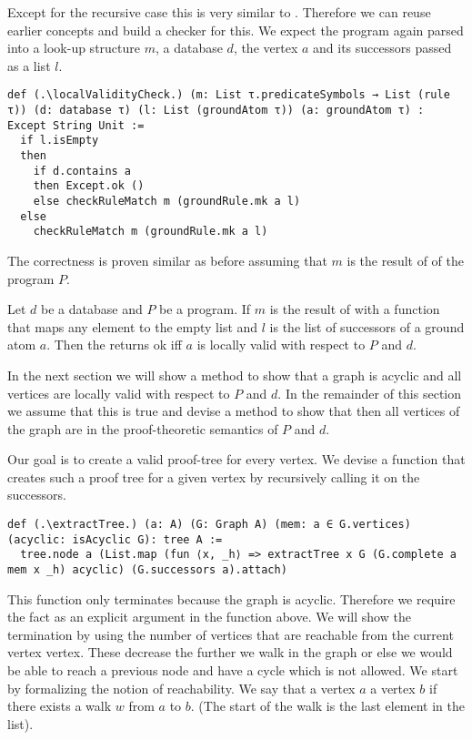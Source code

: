 Except for the recursive case this is very similar to \isValid. Therefore we can reuse earlier concepts and build a checker for this. We expect the program again parsed into a look-up structure $m$, a database $d$, the vertex $a$ and its successors passed as a list $l$.

\begin{lstlisting}
def (.\localValidityCheck.) (m: List τ.predicateSymbols → List (rule τ)) (d: database τ) (l: List (groundAtom τ)) (a: groundAtom τ) : Except String Unit :=
  if l.isEmpty
  then
    if d.contains a
    then Except.ok ()
    else checkRuleMatch m (groundRule.mk a l)
  else
    checkRuleMatch m (groundRule.mk a l)
\end{lstlisting}

The correctness is proven similar as before assuming that $m$ is the result of \parseProgramToSymbolSequenceMap of the program $P$.

\begin{lemma}[\localValidityCheckUnitIffLocallyValid]
    Let $d$ be a database and $P$ be a program. If $m$ is the result of \parseProgramToSymbolSequenceMap with a function that maps any element to the empty list and $l$ is the list of successors of a ground atom $a$. Then the \localValidityCheck returns ok iff $a$ is locally valid with respect to $P$ and $d$.
\end{lemma}

In the next section we will show a method to show that a graph is acyclic and all vertices are locally valid with respect to $P$ and $d$. In the remainder of this section we assume that this is true and devise a method to show that then all vertices of the graph are in the proof-theoretic semantics of $P$ and $d$.

Our goal is to create a valid proof-tree for every vertex. We devise a function that creates such a proof tree for a given vertex by recursively calling it on the successors.

\begin{lstlisting}
def (.\extractTree.) (a: A) (G: Graph A) (mem: a ∈ G.vertices) (acyclic: isAcyclic G): tree A :=
  tree.node a (List.map (fun ⟨x, _h⟩ => extractTree x G (G.complete a mem x _h) acyclic) (G.successors a).attach)
\end{lstlisting}

This function only terminates because the graph is acyclic. Therefore we require the fact as an explicit argument in the function above. We will show the termination by using the number of vertices that are reachable from the current vertex vertex. These decrease the further we walk in the graph or else we would be able to reach a previous node and have a cycle which is not allowed. We start by formalizing the notion of reachability. We say that a vertex $a$ \canReach a vertex $b$ if there exists a walk $w$ from $a$ to $b$. (The start of the walk is the last element in the list).

